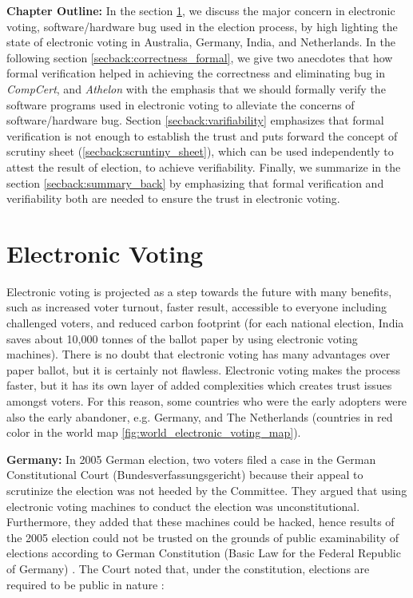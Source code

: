  
\textbf{Chapter Outline:}
 In the section \ref{secback:electronic_voting}, we discuss 
 the major concern in electronic voting, software/hardware 
 bug used in the election process, by high lighting the 
 state of electronic voting in Australia, Germany, India, 
 and Netherlands. In the following section \ref{secback:correctness_formal}, we  give 
 two anecdotes that how formal verification helped in achieving 
 the correctness and eliminating bug in \textit{CompCert}, 
 and \textit{Athelon} with 
 the emphasis that we should formally verify the software programs
 used in electronic voting to alleviate the concerns of 
 software/hardware bug. Section \ref{secback:varifiability} 
 emphasizes that formal verification is not enough
 to establish the trust and puts forward the concept of 
 scrutiny sheet (\ref{secback:scruntiny_sheet}), which 
 can be used independently to attest the result of election, 
 to achieve verifiability. Finally, we summarize in the section \ref{secback:summary_back}
 by emphasizing that formal verification and verifiability both are needed 
 to ensure the trust in electronic voting. 
 
  

\section{Electronic Voting}
 \label{secback:electronic_voting}
  Electronic voting is projected as a step towards the future with 
  many benefits, such as increased voter turnout, faster result, 
  accessible to everyone including challenged voters, and reduced 
  carbon footprint (for each 
  national election, India saves about 10,000 tonnes of the ballot 
  paper by using electronic voting machines). 
  There is no doubt that electronic voting has many advantages 
  over paper ballot, but it is certainly not flawless.  
  Electronic voting makes 
  the process faster, but it has its own layer of added complexities 
  which creates trust issues amongst voters. For this reason, some countries 
  who were the early adopters were also the early abandoner, e.g.
  Germany, and The Netherlands (countries in red color in the world map 
  \ref{fig:world_electronic_voting_map}).
  
  
  \textbf{Germany:} In 2005 German election, two voters filed a case in the German 
  Constitutional Court (Bundesverfassungsgericht) because their 
  appeal to scrutinize the election 
  was not heeded by the Committee. They argued that using electronic 
  voting machines to conduct the election was unconstitutional. Furthermore,
  they added that
  these machines could be hacked, hence results of the 2005 election 
  could not be trusted on the grounds 
  of public examinability of elections according to German Constitution 
  (Basic Law for the Federal Republic of Germany) \citep{Germanconst}. 
  The Court noted that, under the constitution, elections are 
  required to be public in nature \citep{Germanconst}:
  

